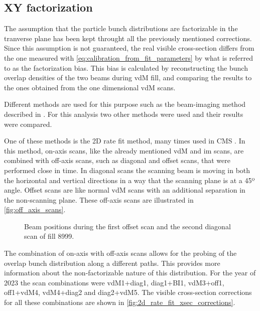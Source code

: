 \subsection{XY factorization}

The assumption that the particle bunch distributions are factorizable in the tranverse plane has been kept throught all the previously mentioned corrections. Since this assumption is not guaranteed, the real visible cross-section differs from the one measured with \autoref{eq:calibration_from_fit_parameters} by what is referred to as the factorization bias. This bias is calculated by reconstructing the bunch overlap densities of the two beams during vdM fill, and comparing the results to the ones obtained from the one dimensional vdM scans.

Different methods are used for this purpose such as the beam-imaging method described in \cite{Klute_2017, knolle2019factorizationbiasvander, Knolle:442689}. For this analysis two other methods were used and their results were compared.

One of these methods is the 2D rate fit method, many times used in CMS \cite{CMS-PAS-LUM-18-002, CMS-PAS-LUM-22-001}. In this method, on-axis scans, like the already mentioned vdM and im scans, are combined with off-axis scans, such as diagonal and offset scans, that were performed close in time. In diagonal scans the scanning beam is moving in both the horizontal and vertical directions in a way that the scanning plane is at a 45º angle. Offset scans are like normal vdM scans with an additional separation in the non-scanning plane. These off-axis scans are illustrated in \autoref{fig:off_axis_scans}.

\begin{figure}[!htb]
	\centering
	\caption{Beam positions during the first offset scan and the second diagonal scan of fill 8999.}
	\label{fig:off_axis_scans}
\end{figure}

The combination of on-axis with off-axis scans allows for the probing of the overlap bunch distribution along a different paths. This provides more information about the non-factorizable nature of this distribution. For the year of 2023 the scan combinations were vdM1+diag1, diag1+BI1, vdM3+off1, off1+vdM4, vdM4+diag2 and diag2+vdM5. The visible cross-section corrections for all these combinations are shown in \autoref{fig:2d_rate_fit_xsec_corrections}.

